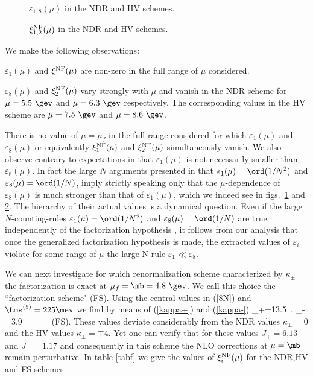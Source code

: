 \begin{figure}   %
    \begin{center}

    \end{center}
    \caption[]{$\varepsilon_{1,8}(\mu)$ in the NDR and HV schemes.}
    \label{SILV1}
\end{figure}

\begin{figure}   %
    \begin{center}

    \end{center}
    \caption[]{$\xi^{\rm NF}_{1,2}(\mu)$ in the NDR and HV schemes.}
    \label{SILV2}
\end{figure}

We make the following observations:
\bi
\item
$\varepsilon_1(\mu)$ and $\xi_1^{\rm NF}(\mu)$ are non-zero in the
full range of $\mu$ considered.
\item
$\varepsilon_8(\mu)$ and $\xi_2^{\rm NF}(\mu)$ vary strongly with
$\mu$ and vanish in the NDR scheme for $\mu=5.5~\gev$ and 
$\mu=6.3~\gev$
respectively. The corresponding values in the HV scheme are
$\mu=7.5~\gev$ and $\mu=8.6~\gev$.
\item
There is no value of $\mu=\mu_f$ in the full range considered for
which $\varepsilon_1(\mu)$ and $\varepsilon_8(\mu)$ or equivalently
$\xi_1^{\rm NF}(\mu)$ and $\xi_2^{\rm NF}(\mu)$ simultaneously
vanish. We also observe contrary to expectations in \cite{NS97}
that $\varepsilon_1(\mu)$ is not necessarily smaller than
$\varepsilon_8(\mu)$. In fact the large $N$ arguments presented
in \cite{NS97} that $\varepsilon_1(\mu)=\ord(1/N^2)$ and
$\varepsilon_8(\mu)=\ord(1/N)$, imply strictly speaking only
that the $\mu$-dependence of $\varepsilon_8(\mu)$
is much stronger than that of $\varepsilon_1(\mu)$,
which we indeed see in figs.~\ref{SILV1}  and \ref{SILV2}.
 The hierarchy of their actual
values is a dynamical question. Even if the large $N$-counting-rules
$\varepsilon_1(\mu)=\ord(1/N^2)$ and
$\varepsilon_8(\mu)=\ord(1/N)$ are true independently of the
factorization hypothesis \cite{EW,BGR}, it follows from our analysis
that once the generalized factorization hypothesis is made, the
extracted values of $\varepsilon_i$ violate for some range of $\mu$
the large-N rule $\varepsilon_1\ll\varepsilon_8$. 
\ei

We can next investigate for which renormalization scheme characterized
by $\kappa_\pm$ the factorization is exact at $\mu_f=\mb=4.8~\gev$.
We call this choice the ``factorization scheme" (FS).
Using the central values in (\ref{8N}) and $\Lms^{(5)}=225\mev$
we find by means of
(\ref{kappa+}) and (\ref{kappa-})
\be\label{KPKM}
\kappa_+=13.5~, \qquad  \kappa_-=3.9~~~~~~~({\rm FS}).
\ee
These values deviate considerably from the NDR values $\kappa_\pm=0$
and the HV values $\kappa_\pm=\mp 4 $. Yet one can verify that for these
values $J_+=6.13 $ and $J_-=1.17$ and consequently in this scheme the NLO
corrections at $\mu=\mb$ remain perturbative.
In table \ref{tabf} we give the values of 
$\xi_i^{\rm NF}(\mu)$ for the NDR,HV and FS schemes. 

